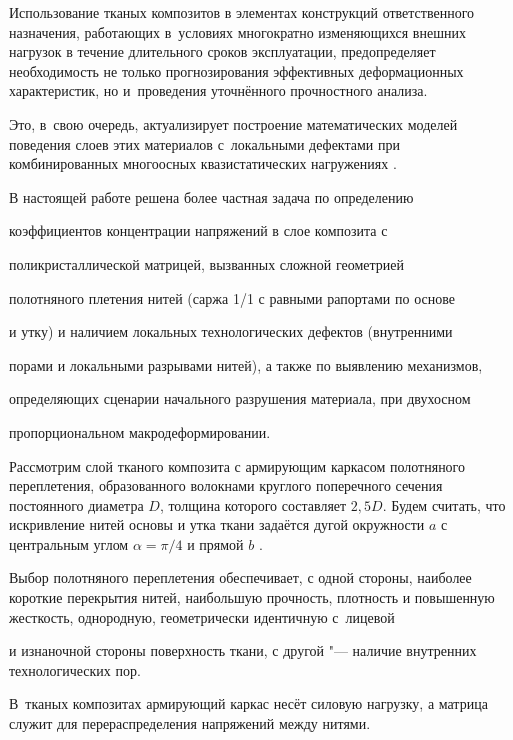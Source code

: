 Использование тканых композитов в элементах конструкций ответственного назначения, работающих в~условиях многократно изменяющихся внешних нагрузок в течение длительного сроков эксплуатации, предопределяет необходимость не только  прогнозирования эффективных деформационных характеристик, но и~проведения уточнённого прочностного анализа. 

Это, в~свою очередь, актуализирует построение математических моделей поведения слоев этих материалов с~локальными дефектами при комбинированных многоосных квазистатических нагружениях \cite{dedkov:bib:dedkov, dedkov:bib:dedkov2}.



В настоящей работе решена более частная задача по определению

коэффициентов концентрации напряжений в слое композита с

поликристаллической матрицей, вызванных сложной геометрией

полотняного плетения нитей (саржа 1/1 с равными рапортами по основе

и утку) и наличием локальных технологических дефектов (внутренними

порами и локальными разрывами нитей), а также по выявлению механизмов,

определяющих сценарии начального разрушения материала, при двухосном

пропорциональном макродеформировании.



\smallskip




Рассмотрим слой тканого композита с армирующим каркасом полотняного переплетения, образованного волокнами круглого поперечного сечения постоянного диаметра $D$, толщина которого составляет $2{,}5 D$. Будем считать, что искривление нитей основы и утка ткани задаётся дугой окружности $a$ с центральным углом $\alpha = \pi /4 $ и прямой $b$ \cite{dedkov:bib:imankulova}.



Выбор полотняного переплетения обеспечивает, с одной стороны, наиболее короткие перекрытия нитей, наибольшую прочность, плотность и повышенную жесткость, однородную, геометрически идентичную с~лицевой

и изнаночной стороны поверхность ткани, с другой "--- наличие внутренних технологических пор. 

В~тканых композитах армирующий каркас несёт силовую нагрузку, а матрица служит для перераспределения напряжений между нитями. 

